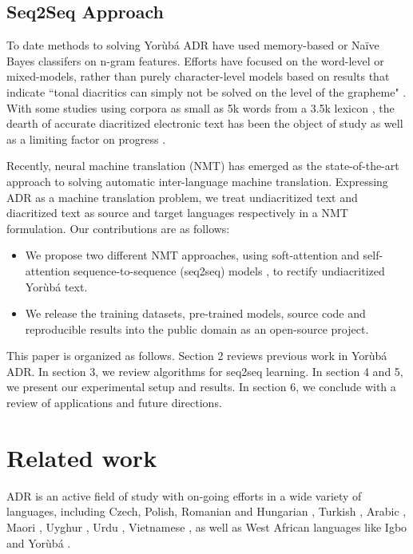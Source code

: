 \documentclass[a4paper]{article}
\begin{document}
\subsection{Seq2Seq Approach}
 
To date methods to solving Yor{\`u}b{\'a} ADR have used memory-based or Na{\"i}ve Bayes classifers on n-gram features. Efforts have focused on the word-level or mixed-models, rather than purely character-level models based on results that indicate ``tonal diacritics can simply not be solved on the level of the grapheme" \cite{de2007automatic}. With some studies using corpora as small as 5k words from a 3.5k lexicon \cite{scannell2011statistical}, the dearth of accurate diacritized electronic text has been the object of study as well as a limiting factor on progress \cite{adegbola2012quantifying}. 

Recently, neural machine translation (NMT) has emerged as the state-of-the-art approach to solving automatic inter-language machine translation. Expressing ADR as a machine translation problem, we treat undiacritized text and diacritized text as source and target languages respectively in a NMT formulation. Our contributions are as follows:
\begin{itemize}
\item We propose two different NMT approaches, using soft-attention and self-attention sequence-to-sequence (seq2seq) models \cite{bahdanau2014neural}\cite{vaswani2017attention}, to rectify undiacritized Yor{\`u}b{\'a} text.
\item We release the training datasets, pre-trained models, source code and reproducible results into the public domain as an open-source project.
\end{itemize}
This paper is organized as follows. Section 2 reviews previous work in Yor{\`u}b{\'a} ADR. In section 3, we review algorithms for seq2seq learning. In section 4 and 5, we present our experimental setup and results. In section 6, we conclude with a review of applications and future directions.

\section{Related work}

ADR is an active field of study with on-going efforts in a wide variety of languages, including Czech, Polish, Romanian and Hungarian \cite{novak2015automatic}\cite{tufics2008diac+}\cite{mihalcea2002letter}, Turkish \cite{arslan2016deasciification}, Arabic \cite{khorsheed2012hmm}\cite{belinkov2015arabic}\cite{nelken2005arabic}\cite{schlippe2008diacritization}, Maori \cite{cocks2011word}, Uyghur \cite{tursun2017noisy}, Urdu \cite{raza2010automatic}, Vietnamese \cite{pham2017use}\cite{luu2012pointwise}\cite{do2013machine}, as well as West African languages like Igbo \cite{ezeani2016automatic} and Yor{\`u}b{\'a} \cite{de2007automatic}\cite{scannell2011statistical}\cite{adegbola2012quantifying}\cite{asahiah2017restoring}. 
\end{document}
